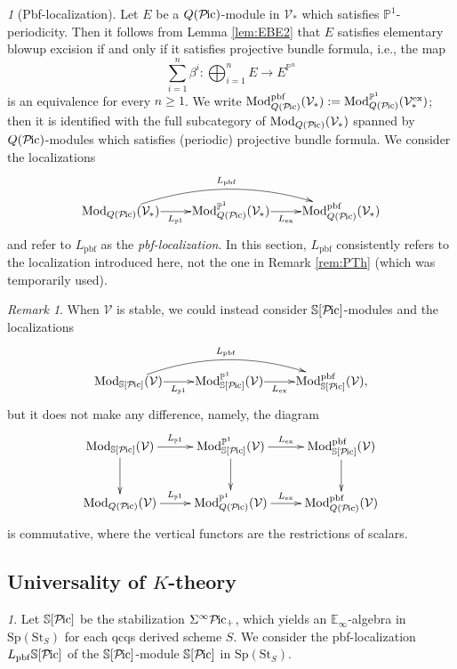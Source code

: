 \documentclass{amsart}
\theoremstyle{plain}
\theoremstyle{definition}
\theoremstyle{remark}
\newtheorem{remark}[theorem]{Remark}
\newtheorem{p}[theorem]{}
\numberwithin{equation}{theorem}
\newcommand{\mbb}[1]{\mathbb{#1}}
\newcommand{\Mod}{\mathrm{Mod}}
\newcommand{\Sp}{\mathrm{Sp}}
\newcommand{\St}{\mathrm{St}}
\newcommand{\V}{\mathcal{V}}
\newcommand{\ex}{\mathrm{ex}}
\newcommand{\pbf}{\mathrm{pbf}}
\newcommand{\Pic}{{\mathcal{P}\mspace{-2.0mu}\mathrm{ic}}}
\begin{document}
\begin{p}[Pbf-localization]
Let $E$ be a $Q(\Pic)$-module in $\V_*$ which satisfies $\mbb{P}^1$-periodicity.
Then it follows from Lemma \ref{lem:EBE2} that $E$ satisfies elementary blowup excision if and only if it satisfies projective bundle formula, i.e., the map
\[
	\sum_{i=1}^n \beta^i \colon \bigoplus_{i=1}^n E \to E^{\mbb{P}^n}
\]
is an equivalence for every $n\ge 1$.
We write $\Mod_{Q(\Pic)}^\pbf(\V_*):=\Mod_{Q(\Pic)}^{\mbb{P}^1}(\V^\ex_*)$; then it is identified with the full subcategory of $\Mod_{Q(\Pic)}(\V_*)$ spanned by $Q(\Pic)$-modules which satisfies (periodic) projective bundle formula.
We consider the localizations
\[
\xymatrix@1{
	\Mod_{Q(\Pic)}(\V_*) \ar[r]_-{L_{\mbb{P}^1}} \ar@/^1.5pc/[rr]^-{L_\pbf} & \Mod^{\mbb{P}^1}_{Q(\Pic)}(\V_*) \ar[r]_-{L_\ex} & \Mod_{Q(\Pic)}^\pbf(\V_*)
}
\]
and refer to $L_\pbf$ as the \textit{pbf-localization}.
In this section, $L_\pbf$ consistently refers to the localization introduced here, not the one in Remark \ref{rem:PTh} (which was temporarily used).
\end{p}

\begin{remark}
When $\V$ is stable, we could instead consider $\mbb{S}[\Pic]$-modules and the localizations
\[
\xymatrix@1{
	\Mod_{\mbb{S}[\Pic]}(\V) \ar[r]_-{L_{\mbb{P}^1}} \ar@/^1.5pc/[rr]^-{L_\pbf} &
		\Mod^{\mbb{P}^1}_{\mbb{S}[\Pic]}(\V) \ar[r]_-{L_\ex} & \Mod_{\mbb{S}[\Pic]}^\pbf(\V),
}
\]
but it does not make any difference, namely, the diagram
\[
\xymatrix{
	\Mod_{\mbb{S}[\Pic]}(\V) \ar[r]^-{L_{\mbb{P}^1}} \ar[d] &
		\Mod^{\mbb{P}^1}_{\mbb{S}[\Pic]}(\V) \ar[r]^-{L_\ex} \ar[d] & \Mod_{\mbb{S}[\Pic]}^\pbf(\V) \ar[d] \\
	\Mod_{Q(\Pic)}(\V) \ar[r]^-{L_{\mbb{P}^1}} & \Mod^{\mbb{P}^1}_{Q(\Pic)}(\V) \ar[r]^-{L_\ex} & \Mod_{Q(\Pic)}^\pbf(\V)
}
\]
is commutative, where the vertical functors are the restrictions of scalars.
\end{remark}


\subsection{Universality of $K$-theory}\label{AlK}

\begin{p}
Let $\mbb{S}[\Pic]$ be the stabilization $\Sigma^\infty\Pic_+$, which yields an $\mbb{E}_\infty$-algebra in $\Sp(\St_S)$ for each qcqs derived scheme $S$.
We consider the pbf-localization $L_\pbf\mbb{S}[\Pic]$ of the $\mbb{S}[\Pic]$-module $\mbb{S}[\Pic]$ in $\Sp(\St_S)$.
\end{p}
\end{document}
